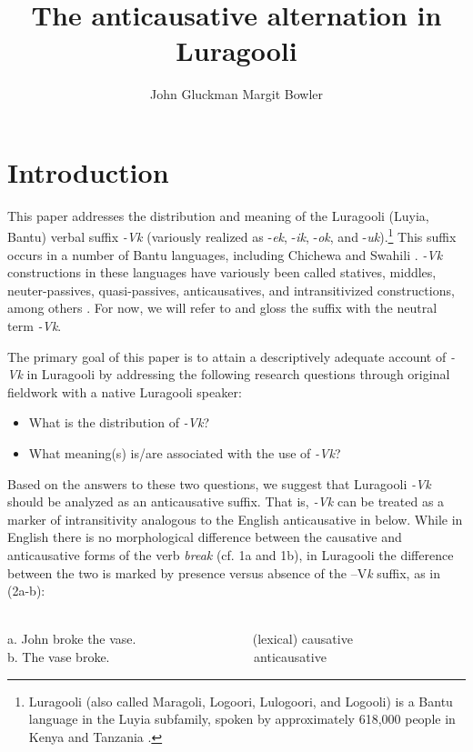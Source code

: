 \documentclass[output=paper]{langsci/langscibook}
\title{The anticausative alternation in Luragooli}
\author{%
 John Gluckman\affiliation{UCLA}\lastand 
 Margit Bowler \affiliation{UCLA}
}
\begin{document}
\section{Introduction}

This paper addresses the distribution and meaning of the Luragooli (Luyia, Bantu) verbal suffix \textit{-Vk} (variously realized as -\textit{ek}, -\textit{ik}, -\textit{ok}, and -\textit{uk}).\footnote{ Luragooli (also called Maragoli, Logoori, Lulogoori, and Logooli) is a Bantu language in the Luyia subfamily, spoken by approximately 618,000 people in Kenya and Tanzania \citep{LewisEtAl2015}.} This suffix occurs in a number of Bantu languages, including Chichewa \citep{Mchombo1993,Simango2009} and Swahili \citep{SeidlDimitriadis2003}. \textit{-Vk} constructions in these languages have variously been called statives, middles, neuter-passives, quasi-passives, anticausatives, and intransitivized constructions, among others \citep{Mchombo1993,DubinskySimango1996,SeidlDimitriadis2003,Fernando2013}. For now, we will refer to and gloss the suffix with the neutral term \textit{-Vk}.

The primary goal of this paper is to attain a descriptively adequate account of \textit{-Vk} in Luragooli by addressing the following research questions through original fieldwork with a native Luragooli speaker:

\begin{itemize}
\item What is the distribution of \textit{-Vk}?
\item What meaning(s) is/are associated with the use of \textit{-Vk}?
\end{itemize}

Based on the answers to these two questions, we suggest that Luragooli \textit{-Vk }should be analyzed as an anticausative suffix. That is, \textit{-Vk} can be treated as a marker of intransitivity analogous to the English anticausative in  below. While in English there is no morphological difference between the causative and anticausative forms of the verb \textit{break }(cf. 1a and 1b), in Luragooli the difference between the two is marked by presence versus absence of the –V\textit{k }suffix, as in (2a-b):


\ea\label{exx:}
\ea
{}\\
 a.  John broke the vase.~~~ ~~~ ~~~ ~~~ ~~~       (lexical) causative \\
 b.  The vase broke. ~~~ ~~~ ~~~ ~~~ ~~~ ~~~       anticausative \\
 \z
\z
\end{document}
